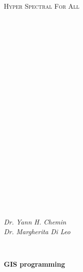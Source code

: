 \documentclass[10pt]{book}
\begin{document}
\begin{titlepage}
\begin{center}
\ \\
\ \\
\ \\
\ \\
%
\ \\
\ \\
\ \\ %
\textsc{\Large
Hyper Spectral For All\\
}
\ \\
\ \\
\ \\
\ \\
\ \\
\ \\
\ \\
\ \\
\ \\
\ \\
\ \\
\textsc{\Large
\\
\ \\}
\ \\
\ \\
\ \\
\ \\
\ \\
\ \\
%
\vfill %
\begin{minipage}{0.4\textwidth}
\begin{flushleft} \large
\end{flushleft}
\end{minipage}
%
\begin{minipage}{0.4\textwidth}
\begin{flushright}
\ \\
\ \\
\emph{Dr. Yann H. Chemin\\Dr. Margherita Di Leo}

\footnotesize{\ }
\end{flushright}
\end{minipage}
%
%
\end{center}
\end{titlepage}
\begin{flushleft}
 \textbf{GIS programming}
\end{flushleft}
\end{document}
